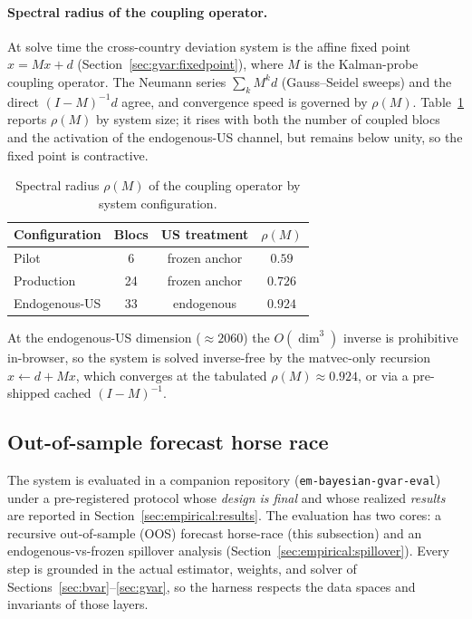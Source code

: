 \documentclass[11pt]{article}
\theoremstyle{definition}
\theoremstyle{remark}
\begin{document}
\paragraph{Spectral radius of the coupling operator.} At solve time the cross-country deviation system is the affine fixed point $x = Mx + d$ (Section~\ref{sec:gvar:fixedpoint}), where $M$ is the Kalman-probe coupling operator. The Neumann series $\sum_k M^k d$ (Gauss--Seidel sweeps) and the direct $(I-M)^{-1}d$ agree, and convergence speed is governed by $\rho(M)$. Table~\ref{tab:empirical:rho} reports $\rho(M)$ by system size; it rises with both the number of coupled blocs and the activation of the endogenous-US channel, but remains below unity, so the fixed point is contractive.

\begin{table}[!ht]
\centering
\caption{Spectral radius $\rho(M)$ of the coupling operator by system configuration.}
\label{tab:empirical:rho}
\begin{tabular}{lccc}
\toprule
Configuration & Blocs & US treatment & $\rho(M)$ \\
\midrule
Pilot         & 6  & frozen anchor & $0.59$ \\
Production    & 24 & frozen anchor & $0.726$ \\
Endogenous-US & 33 & endogenous    & $0.924$ \\
\bottomrule
\end{tabular}
\end{table}

At the endogenous-US dimension ($\approx 2060$) the $O(\dim^3)$ inverse is prohibitive in-browser, so the system is solved inverse-free by the matvec-only recursion $x \leftarrow d + Mx$, which converges at the tabulated $\rho(M)\approx 0.924$, or via a pre-shipped cached $(I-M)^{-1}$.

\subsection{Out-of-sample forecast horse race}\label{sec:empirical:oos}

The system is evaluated in a companion repository
(\texttt{em-bayesian-gvar-eval}) under a pre-registered protocol whose
\emph{design is final} and whose realized \emph{results} are reported in
Section~\ref{sec:empirical:results}. The evaluation has
two cores: a recursive out-of-sample (OOS) forecast horse-race
(this subsection) and an endogenous-vs-frozen spillover analysis
(Section~\ref{sec:empirical:spillover}). Every step is grounded in the
actual estimator, weights, and solver of
Sections~\ref{sec:bvar}--\ref{sec:gvar}, so the harness respects the data
spaces and invariants of those layers.
\end{document}
